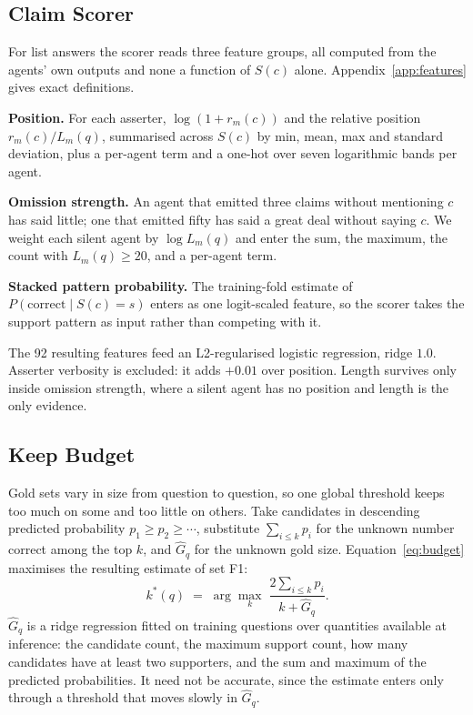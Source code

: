 \documentclass[11pt]{article}
\begin{document}
\subsection{Claim Scorer}
\label{sec:slotA}

For list answers the scorer reads three feature groups, all computed from the agents'
own outputs and none a function of $S(c)$ alone. Appendix~\ref{app:features} gives exact
definitions.

\textbf{Position.} For each asserter, $\log(1 + r_m(c))$ and the relative position
$r_m(c)/L_m(q)$, summarised across $S(c)$ by min, mean, max and standard deviation, plus
a per-agent term and a one-hot over seven logarithmic bands per agent.

\textbf{Omission strength.} An agent that emitted three claims without mentioning $c$ has
said little; one that emitted fifty has said a great deal without saying $c$. We weight
each silent agent by $\log L_m(q)$ and enter the sum, the maximum, the count with
$L_m(q) \geq 20$, and a per-agent term.

\textbf{Stacked pattern probability.} The training-fold estimate of
$P(\mathrm{correct} \mid S(c) = s)$ enters as one logit-scaled feature, so the scorer
takes the support pattern as input rather than competing with it.

The 92 resulting features feed an L2-regularised logistic regression, ridge $1.0$.
Asserter verbosity is excluded: it adds $+0.01$ over position. Length survives only
inside omission strength, where a silent agent has no position and length is the only
evidence.

\subsection{Keep Budget}
\label{sec:slotB}

Gold sets vary in size from question to question, so one global threshold keeps too much
on some and too little on others. Take candidates in descending predicted probability
$p_1 \geq p_2 \geq \cdots$, substitute $\sum_{i \leq k} p_i$ for the unknown number
correct among the top $k$, and $\hat{G}_q$ for the unknown gold size.
Equation~\ref{eq:budget} maximises the resulting estimate of set F1:
\begin{equation}
\label{eq:budget}
  k^*(q) \;=\; \arg\max_k \; \frac{2 \sum_{i \leq k} p_i}{k + \hat{G}_q}.
\end{equation}
$\hat{G}_q$ is a ridge regression fitted on training questions over quantities available
at inference: the candidate count, the maximum support count, how many candidates have
at least two supporters, and the sum and maximum of the predicted probabilities. It need
not be accurate, since the estimate enters only through a threshold that moves slowly in
$\hat{G}_q$.
\end{document}
